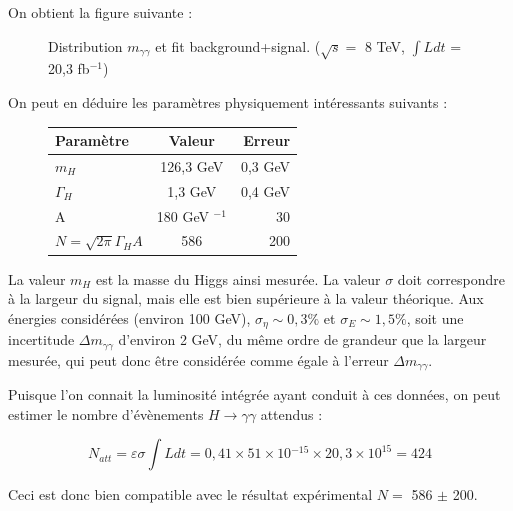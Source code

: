 \documentclass[11pt]{article} %
\begin{document}
On obtient la figure suivante :

\begin{figure}[H]
\centering
  \caption{Distribution $m_{\gamma \gamma}$ et fit background+signal. ($\sqrt{s} =$ 8 TeV,  $\int L dt$ = 20,3 fb$^{-1}$) }
 \resizebox{.9\linewidth}{!}{}
\end{figure}

On peut en déduire les paramètres physiquement intéressants suivants :

\begin{figure}[H]
\centering
\begin{tabular}{|l|c|r|} 
   \hline
   Paramètre & Valeur & Erreur \\
    \hline
   $m_H$ & 126,3 GeV & 0,3 GeV\\
  \hline
   $\Gamma_H$ & 1,3 GeV & 0,4 GeV \\
  \hline
A & 180 GeV ${}^{-1}$ & 30\\

 \hline
$N = \sqrt{2\pi} \Gamma_H A$ & 586 & 200\\
\hline
\end{tabular}
\end{figure}

La valeur $m_H$ est la masse du Higgs ainsi mesurée. La valeur $\sigma$ doit correspondre à la largeur du signal, mais elle est bien supérieure à la valeur théorique. Aux énergies considérées (environ 100 GeV), $\sigma_{\eta} \sim 0,3 \%$ \cite{resolution_position_photons} et $\sigma_{E} \sim 1,5 \%$, soit une incertitude $\Delta m_{\gamma\gamma}$ d'environ 2 GeV, du même ordre de grandeur que la largeur mesurée, qui peut donc être considérée comme égale à l'erreur $\Delta m_{\gamma\gamma}$.


Puisque l'on connait la luminosité intégrée ayant conduit à ces données, on peut estimer le nombre d'évènements $H \to \gamma\gamma$ attendus :

\begin{equation}
N_{att} = \varepsilon \sigma \int L dt = 0,41 \times 51 \times  \mbox{10} {}^{-15} \times 20,3 \times 10^{15} = 424
\end{equation}

Ceci est donc bien compatible avec le résultat expérimental $N =$ 586 $\pm$ 200.
\end{document}
